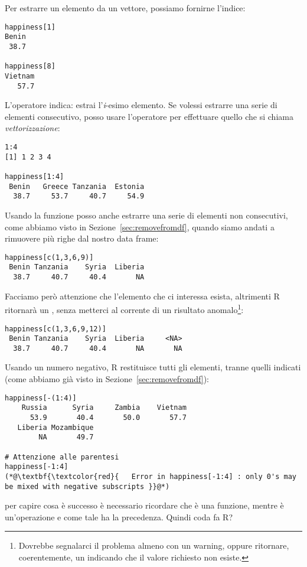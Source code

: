 \noindent Per estrarre un elemento da un vettore, possiamo fornirne l'indice:
\begin{lstlisting}[style=Rstyle]
happiness[1]
Benin 
 38.7 
 
happiness[8]
Vietnam 
   57.7 
\end{lstlisting}
%
L'operatore \lsin{[i]} indica: estrai l'\emph{i}-esimo elemento. Se volessi estrarre una serie di elementi consecutivo, posso usare l'operatore \lsin{:} per effettuare quello che si chiama \emph{vettorizzazione}:

\begin{lstlisting}[style=Rstyle]
1:4
[1] 1 2 3 4

happiness[1:4]
 Benin   Greece Tanzania  Estonia 
  38.7     53.7     40.7     54.9 
\end{lstlisting}
%
Usando la funzione  posso anche estrarre una serie di elementi non consecutivi, come abbiamo visto in Sezione~\ref{sec:removefromdf}, quando siamo andati a rimuovere pi\`u righe dal nostro data frame:

\begin{lstlisting}[style=Rstyle]
happiness[c(1,3,6,9)]
 Benin Tanzania    Syria  Liberia 
  38.7     40.7     40.4       NA 
\end{lstlisting}
%
Facciamo per\`o attenzione che l'elemento che ci interessa esista, altrimenti R ritornar\`a un , senza metterci al corrente di un risultato anomalo\footnote{Dovrebbe segnalarci il problema almeno con un warning, oppure ritornare, coerentemente, un  indicando che il valore richiesto non esiste.}:

\begin{lstlisting}[style=Rstyle]
happiness[c(1,3,6,9,12)]
 Benin Tanzania    Syria  Liberia     <NA> 
  38.7     40.7     40.4       NA       NA 
\end{lstlisting}

\vspace{0.2cm}

\noindent Usando un numero negativo, R restituisce tutti gli elementi, tranne quelli indicati (come abbiamo gi\`a visto in Sezione~\ref{sec:removefromdf}):

\begin{lstlisting}[style=Rstyle]
happiness[-(1:4)]
    Russia      Syria     Zambia    Vietnam 
      53.9       40.4       50.0       57.7 
   Liberia Mozambique 
        NA       49.7 
   
# Attenzione alle parentesi
happiness[-1:4]
(*@\textbf{\textcolor{red}{   Error in happiness[-1:4] : only 0's may be mixed with negative subscripts }}@*)
\end{lstlisting}
%
per capire cosa \`e successo \`e necessario ricordare che \lsin{:} \`e una funzione, mentre \lsin{-} \`e un'operazione e come tale ha la precedenza. Quindi coda fa R?

